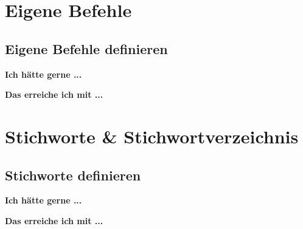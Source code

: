 \documentclass[twoside, 
               a4paper, 
               10pt, 
               parskip=full, 
               sectionentrydots=true, 
               listof=totoc, 
               listof=entryprefix,
               numbers=endperiod]{scrartcl}
\begin{document}

\newpage
\section{Eigene Befehle}
\subsection{Eigene Befehle definieren}

{\textbf {Ich hätte gerne ...}}
 
\begin{miniSeite}[colbacktitle=black!35!white,title=Ausdruck]

\end{miniSeite}


\newpage
{\textbf {Das erreiche ich mit ...}}
 
\begin{miniSeite}[colbacktitle=black!35!white,title=\LaTeX-Code]

\end{miniSeite}





\newpage
\section{Stichworte \& Stichwortverzeichnis}
\subsection{Stichworte definieren}

{\textbf {Ich hätte gerne ...}}
 
\begin{miniSeite}[colbacktitle=black!35!white,title=Ausdruck]

\end{miniSeite}


\newpage
{\textbf {Das erreiche ich mit ...}}
 
\begin{miniSeite}[colbacktitle=black!35!white,title=\LaTeX-Code]

\end{miniSeite}

\end{document}
